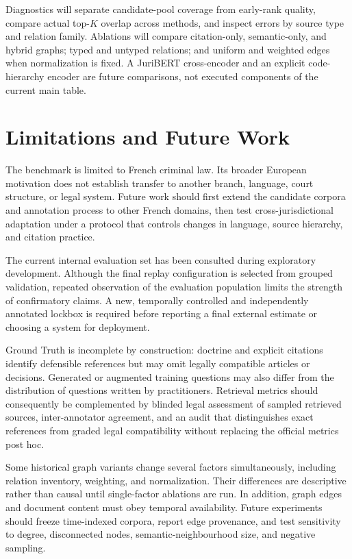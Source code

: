 \documentclass[runningheads]{llncs}
\begin{document}
Diagnostics will separate candidate-pool coverage from early-rank quality, compare actual top-\(K\) overlap across methods, and inspect errors by source type and relation family. Ablations will compare citation-only, semantic-only, and hybrid graphs; typed and untyped relations; and uniform and weighted edges when normalization is fixed. A JuriBERT cross-encoder and an explicit code-hierarchy encoder are future comparisons, not executed components of the current main table.

\FloatBarrier
\section{Limitations and Future Work}

The benchmark is limited to French criminal law. Its broader European motivation does not establish transfer to another branch, language, court structure, or legal system. Future work should first extend the candidate corpora and annotation process to other French domains, then test cross-jurisdictional adaptation under a protocol that controls changes in language, source hierarchy, and citation practice.

The current internal evaluation set has been consulted during exploratory development. Although the final replay configuration is selected from grouped validation, repeated observation of the evaluation population limits the strength of confirmatory claims. A new, temporally controlled and independently annotated lockbox is required before reporting a final external estimate or choosing a system for deployment.

Ground Truth is incomplete by construction: doctrine and explicit citations identify defensible references but may omit legally compatible articles or decisions. Generated or augmented training questions may also differ from the distribution of questions written by practitioners. Retrieval metrics should consequently be complemented by blinded legal assessment of sampled retrieved sources, inter-annotator agreement, and an audit that distinguishes exact references from graded legal compatibility without replacing the official metrics post hoc.

Some historical graph variants change several factors simultaneously, including relation inventory, weighting, and normalization. Their differences are descriptive rather than causal until single-factor ablations are run. In addition, graph edges and document content must obey temporal availability. Future experiments should freeze time-indexed corpora, report edge provenance, and test sensitivity to degree, disconnected nodes, semantic-neighbourhood size, and negative sampling.
\end{document}

